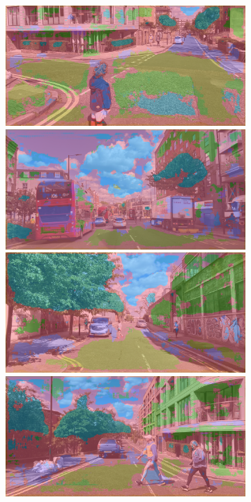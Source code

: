 \begin{figure}[H]
\begin{subfigure}[t]{.32\textwidth}
		\includegraphics[width=\textwidth]{city_images/HackneyScapes/Hackney3171_unet.png} \\[5pt]
		\includegraphics[width=\textwidth]{city_images/HackneyScapes/Hackney3200_unet.png} \\[5pt]
		\includegraphics[width=\textwidth]{city_images/HackneyScapes/Hackney3164_unet.png} \\[5pt]
		\includegraphics[width=\textwidth]{city_images/HackneyScapes/Hackney3173_unet.png} \\[5pt]

\end{subfigure}
\end{figure}
